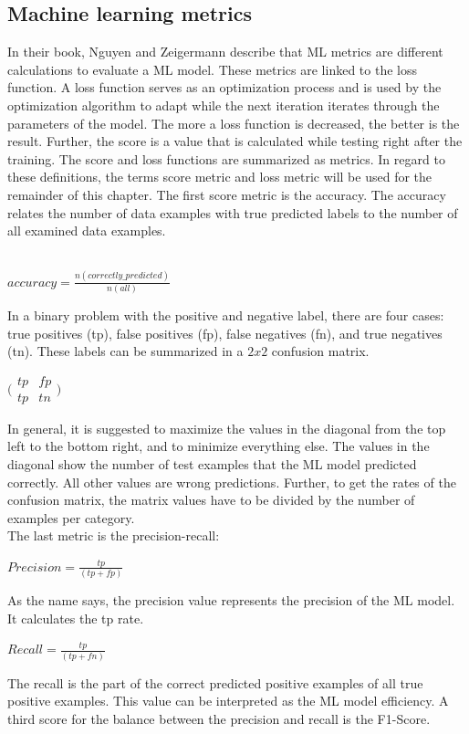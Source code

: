 \subsection{Machine learning metrics}

In their book, Nguyen and Zeigermann \cite{9783960101925} describe that ML metrics are different calculations to evaluate a ML model. These metrics are linked to the loss function. A loss function serves as an optimization process and is used by the optimization algorithm to adapt while the next iteration iterates through the parameters of the model. The more a loss function is decreased, the better is the result. Further, the score is a value that is calculated while testing right after the training. The score and loss functions are summarized as metrics. In regard to these definitions, the terms score metric and loss metric will be used for the remainder of this chapter. The first score metric is the accuracy. The accuracy relates the number of data examples with true predicted labels to the number of all examined data examples. \\ \\
\begin{center}$accuracy=\frac{n(correctly\_predicted)}{n(all)}$ \end{center}
In a binary problem with the positive and negative label, there are four cases: true positives (tp), false positives (fp), false negatives (fn), and true negatives (tn). These labels can be summarized in a $2 x 2$ confusion matrix. \\
\begin{center}
  $\bigl( \begin{matrix}tp & fp\\ tp & tn\end{matrix}\bigr)$
\end{center}
In general, it is suggested to maximize the values in the diagonal from the top left to the bottom right, and to minimize everything else. The values in the diagonal show the number of test examples that the ML model predicted correctly. All other values are wrong predictions. Further, to get the rates of the confusion matrix, the matrix values have to be divided by the number of examples per category. \\ The last metric is the precision-recall:
\begin{center}
  $Precision = \frac{tp}{(tp + fp)}$
\end{center}
As the name says, the precision value represents the precision of the ML model. It calculates the tp rate.
\begin{center}
  $Recall = \frac{tp}{(tp + fn)}$
\end{center}
The recall is the part of the correct predicted positive examples of all true positive examples. This value can be interpreted as the ML model efficiency.
A third score for the balance between the precision and recall is the F1-Score.

